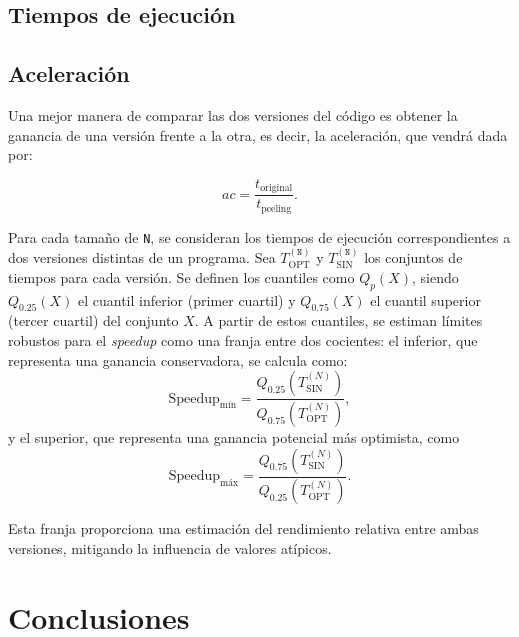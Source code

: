\documentclass[11pt,a4paper,twoside]{article}
\theoremstyle{definition}
\begin{document}
	\subsection{Tiempos de ejecución}
	
	
	
	\subsection{Aceleración}
	
	Una mejor manera de comparar las dos versiones del código es obtener la ganancia de una versión frente a la otra, es decir, la aceleración, que vendrá dada por:
	
	\begin{equation} \label{eq:speedup}
		ac = \dfrac{t_{\text{original}}}{t_{\text{peeling}}}.
	\end{equation}
	
	Para cada tamaño de \texttt{N}, se consideran los tiempos de ejecución correspondientes a dos versiones distintas de un programa. Sea \( T_{\mathrm{OPT}}^{(\texttt{N})} \) y \( T_{\mathrm{SIN}}^{(\texttt{N})} \) los conjuntos de tiempos para cada versión. Se definen los cuantiles como \( Q_p(X) \), siendo \( Q_{0.25}(X) \) el cuantil inferior (primer cuartil) y \( Q_{0.75}(X) \) el cuantil superior (tercer cuartil) del conjunto \( X \). A partir de estos cuantiles, se estiman límites robustos para el \textit{speedup} como una franja entre dos cocientes: el inferior, que representa una ganancia conservadora, se calcula como:
	\begin{equation}\label{q1}
		\text{Speedup}_{\text{mín}} = \frac{Q_{0.25}\left(T_{\mathrm{SIN}}^{(N)}\right)}{Q_{0.75}\left(T_{\mathrm{OPT}}^{(N)}\right)},
	\end{equation}
	y el superior, que representa una ganancia potencial más optimista, como
	\begin{equation} \label{q2}
		\text{Speedup}_{\text{máx}} = \frac{Q_{0.75}\left(T_{\mathrm{SIN}}^{(N)}\right)}{Q_{0.25}\left(T_{\mathrm{OPT}}^{(N)}\right)}.
	\end{equation}
	
	Esta franja proporciona una estimación del rendimiento relativa entre ambas versiones, mitigando la influencia de valores atípicos.
	
	
	\section{Conclusiones}


	
	
	
\end{document}
